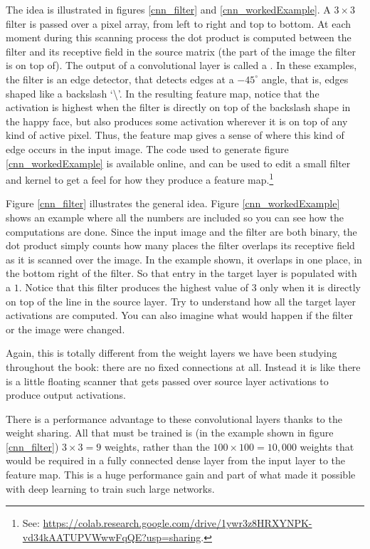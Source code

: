 The idea is illustrated in figures \ref{cnn_filter} and \ref{cnn_workedExample}. A $3 \times 3$ filter is passed over a pixel array, from left to right and top to bottom. At each moment during this scanning process the dot product is computed between the filter and its receptive field in the source matrix (the part of the image the filter is on top of). The output of a convolutional layer is called a . In these examples, the filter is an edge detector, that detects edges at a $-45^\circ$ angle, that is, edges shaped like a backslash `\textbackslash'. In the resulting feature map, notice that the activation is highest when the filter is directly on top of the backslash shape in the happy face, but also produces some activation wherever it is on top of any kind of active pixel. Thus, the feature map gives a sense of where this kind of edge occurs in the input image. The code used to generate figure \ref{cnn_workedExample} is available online, and can be used to edit a small filter and kernel to get a feel for how they produce a feature map.\footnote{See: \url{https://colab.research.google.com/drive/1ywr3z8HRXYNPK-vd34kAATUPVWwwFqQE?usp=sharing}.}

Figure \ref{cnn_filter} illustrates the general idea. Figure \ref{cnn_workedExample} shows an example where all the numbers are included so you can see how the computations are done. Since the input image and the filter are both binary, the dot product simply counts how many places the filter overlaps its receptive field as it is scanned over the image. In the example shown, it overlaps in one place, in the bottom right of the filter.  So that entry in the target layer is populated with a $1$.  Notice that this filter produces the highest value of $3$ only when it is directly on top of the line in the source layer. Try to understand how all the target layer activations are computed. You can also imagine what would happen if the filter or the image were changed.

Again, this is totally different from the weight layers we have been studying throughout the book: there are no fixed connections at all. Instead it is like there is a little floating scanner that gets passed over source layer activations to produce output activations. 

There is a performance advantage to these convolutional layers thanks to the weight sharing. All that must be trained is (in the example shown in figure \ref{cnn_filter}) $3 \times 3=9$ weights, rather than the $100 \times 100 = 10,000$ weights that would be required in a fully connected dense layer from the input layer to the feature map. This is a huge performance gain and part of what  made it possible with deep learning to train such large networks.


